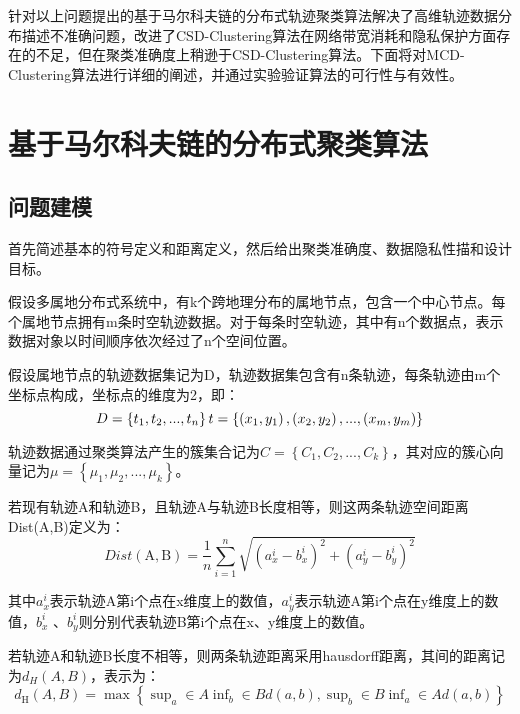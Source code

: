 针对以上问题提出的基于马尔科夫链的分布式轨迹聚类算法解决了高维轨迹数据分布描述不准确问题，改进了CSD-Clustering算法在网络带宽消耗和隐私保护方面存在的不足，但在聚类准确度上稍逊于CSD-Clustering算法。下面将对MCD-Clustering算法进行详细的阐述，并通过实验验证算法的可行性与有效性。

\section{基于马尔科夫链的分布式聚类算法}

\subsection{问题建模}

首先简述基本的符号定义和距离定义，然后给出聚类准确度、数据隐私性描和设计目标。

假设多属地分布式系统中，有k个跨地理分布的属地节点，包含一个中心节点。每个属地节点拥有m条时空轨迹数据。对于每条时空轨迹，其中有n个数据点，表示数据对象以时间顺序依次经过了n个空间位置。

假设属地节点的轨迹数据集记为D，轨迹数据集包含有n条轨迹，每条轨迹由m个坐标点构成，坐标点的维度为2，即：
\[
D=\left\{ t_1,t_2,...,t_n \right\} 
\\
t=\left\{ \left( x_1,y_1 \right) ,\left( x_2,y_2 \right) ,...,\left( x_m,y_m \right) \right\} 
\]

轨迹数据通过聚类算法产生的簇集合记为$C=\left\{ C_1,C_2,...,C_k \right\} $，其对应的簇心向量记为$\mu =\left\{ \mu _1,\mu _2,...,\mu _k \right\} $。

若现有轨迹A和轨迹B，且轨迹A与轨迹B长度相等，则这两条轨迹空间距离Dist(A,B)定义为：
\begin{equation}
\label{ch4dist}
Dist(\mathrm{A}, \mathrm{B})=\frac{1}{n} \sum_{i=1}^{n} \sqrt{\left(a_{x}^{i}-b_{x}^{i}\right)^{2}+\left(a_{y}^{i}-b_{y}^{i}\right)^{2}}
\end{equation}

其中$a_x^i$表示轨迹A第i个点在x维度上的数值，$a_y^i$表示轨迹A第i个点在y维度上的数值，$b_x^i$ 、$b_y^i$则分别代表轨迹B第i个点在x、y维度上的数值。	

若轨迹A和轨迹B长度不相等，则两条轨迹距离采用hausdorff距离，其间的距离记为$d_H(A,B)$，表示为：
\begin{equation}
\label{hausdorffdist}
d_{\text{H}}\left( A,B \right) =\max \left\{ \mathop{\text{sup}}_a\in A\mathop{\text{inf}}_b\in Bd\left( a,b \right) ,\mathop{\text{sup}}_b\in B\mathop{\text{inf}}_a\in Ad\left( a,b \right) \right\} 
\end{equation}

